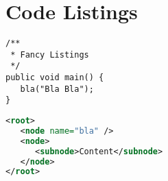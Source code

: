 \section*{Code Listings}

\begin{lstlisting}[caption=Fancy Java Code Listing]
/**
 * Fancy Listings
 */
public void main() {
   bla("Bla Bla");
}
\end{lstlisting}

\begin{lstlisting}[language=XML, caption=Fancy XML]
<root>
   <node name="bla" />
   <node>
      <subnode>Content</subnode>
   </node>
</root>
\end{lstlisting}